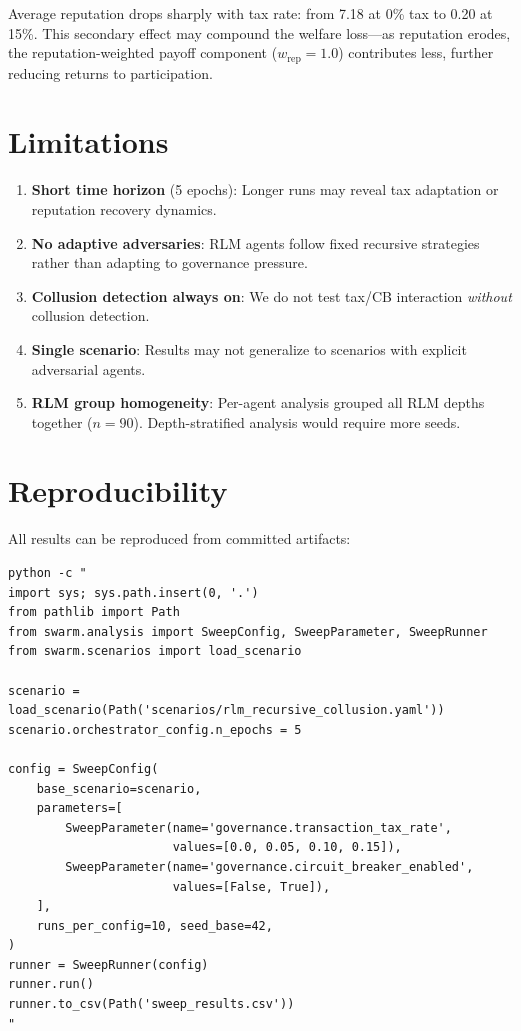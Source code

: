 \documentclass[11pt]{article}
\begin{document}
Average reputation drops sharply with tax rate: from 7.18 at 0\% tax to 0.20 at 15\%. This secondary effect may compound the welfare loss---as reputation erodes, the reputation-weighted payoff component ($w_{\text{rep}} = 1.0$) contributes less, further reducing returns to participation.

\section{Limitations}

\begin{enumerate}
    \item \textbf{Short time horizon} (5 epochs): Longer runs may reveal tax adaptation or reputation recovery dynamics.
    \item \textbf{No adaptive adversaries}: RLM agents follow fixed recursive strategies rather than adapting to governance pressure.
    \item \textbf{Collusion detection always on}: We do not test tax/CB interaction \emph{without} collusion detection.
    \item \textbf{Single scenario}: Results may not generalize to scenarios with explicit adversarial agents.
    \item \textbf{RLM group homogeneity}: Per-agent analysis grouped all RLM depths together ($n = 90$). Depth-stratified analysis would require more seeds.
\end{enumerate}

\section{Reproducibility}

All results can be reproduced from committed artifacts:

\begin{verbatim}
python -c "
import sys; sys.path.insert(0, '.')
from pathlib import Path
from swarm.analysis import SweepConfig, SweepParameter, SweepRunner
from swarm.scenarios import load_scenario

scenario = load_scenario(Path('scenarios/rlm_recursive_collusion.yaml'))
scenario.orchestrator_config.n_epochs = 5

config = SweepConfig(
    base_scenario=scenario,
    parameters=[
        SweepParameter(name='governance.transaction_tax_rate',
                       values=[0.0, 0.05, 0.10, 0.15]),
        SweepParameter(name='governance.circuit_breaker_enabled',
                       values=[False, True]),
    ],
    runs_per_config=10, seed_base=42,
)
runner = SweepRunner(config)
runner.run()
runner.to_csv(Path('sweep_results.csv'))
"
\end{verbatim}
\end{document}
